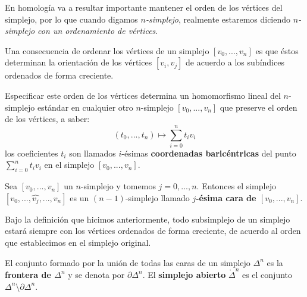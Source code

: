 \documentclass[12pt]{report}
\newcounter{it}
\theoremstyle{largebreak}
\begin{document}
    En homología va a resultar importante mantener el orden de los vértices del simplejo, por lo que cuando digamos \textit{$n$-simplejo}, realmente estaremos diciendo \textit{$n$-simplejo con un ordenamiento de vértices}.

    Una consecuencia de ordenar los vértices de un simplejo $[v_0,...,v_n]$ es que éstos determinan la orientación de los vértices $[v_i,v_j]$ de acuerdo a los subíndices ordenados de forma creciente.

    Especificar este orden de los vértices determina un homomorfismo lineal del $n$-simplejo estándar en cualquier otro $n$-simplejo $[v_0,...,v_n]$ que preserve el orden de los vértices, a saber:
    \begin{equation*}
        (t_0,...,t_n)\mapsto \sum_{ i=0}^n t_iv_i
    \end{equation*}
    los coeficientes $t_i$ son llamados $i$-ésimas \textbf{coordenadas baricéntricas} del punto $\sum_{ i=0}^n t_iv_i$ en el simplejo $[v_0,...,v_n]$.

    \begin{mydef}
        Sea $[v_0,...,v_n]$ un $n$-simplejo y tomemos $j=0,...,n$. Entonces el simplejo $[v_0,...,\hat{v_j},...,v_n]$ es un $(n-1)$-simplejo llamado \textbf{$j$-ésima cara de $[v_0,...,v_n]$}.
    \end{mydef}

    \begin{obs}
        Bajo la definición que hicimos anteriormente, todo subsimplejo de un simplejo estará siempre con los vértices ordenados de forma creciente, de acuerdo al orden que establecimos en el simplejo original. 
    \end{obs}

    \begin{mydef}
        El conjunto formado por la unión de todas las caras de un simplejo $\Delta^n$ es la \textbf{frontera de $\Delta^n$} y se denota por $\partial\Delta^n$. El \textbf{simplejo abierto} $\mathring{\Delta}^n$ es el conjunto $\Delta^n\setminus\partial\Delta^n$.
    \end{mydef}
\end{document}
